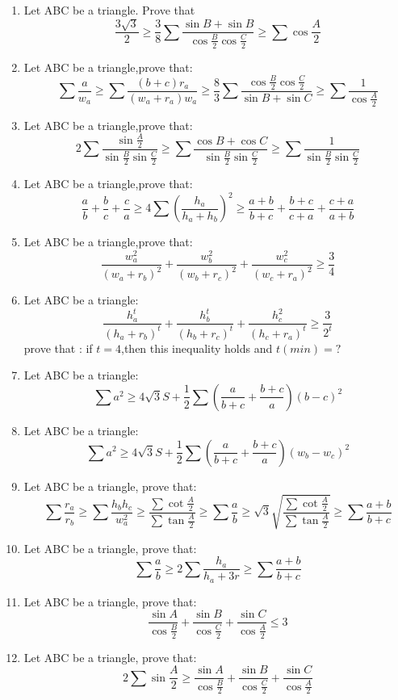 \documentclass{report}
\begin{document}
\begin{enumerate}
	\item Let ABC be a triangle. Prove that$$ \frac{3\sqrt{3}}{2} \geq \frac{3}{8}\sum\frac{\sin{B}+\sin{B}}{\cos\frac{B}{2}\cos\frac{C}{2}} \geq \sum\cos\frac{A}{2}$$
	\item Let ABC be a triangle,prove that:$$ \sum\frac {a}{w_a} \geq \sum\frac {(b + c)r_a}{(w_a + r_a)w_a} \geq \frac {8}{3}\sum\frac {\cos\frac {B}{2}\cos\frac {C}{2}}{\sin{B} + \sin{C}} \geq \sum\frac {1}{\cos\frac {A}{2}}$$
	\item Let ABC be a triangle,prove that:$$ 2\sum\frac{\sin\frac{A}{2}}{\sin\frac{B}{2}\sin\frac{C}{2}} \geq \sum\frac{\cos{B}+\cos{C}}{\sin\frac{B}{2}\sin\frac{C}{2}} \geq \sum\frac{1}{\sin\frac{B}{2}\sin\frac{C}{2}}$$
	\item Let ABC be a triangle,prove that:$$ \frac{a}{b}+\frac{b}{c}+\frac{c}{a} \geq 4\sum(\frac{h_a}{h_a+h_b})^2 \geq \frac{a+b}{b+c}+\frac{b+c}{c+a}+\frac{c+a}{a+b}$$
	\item Let ABC be a triangle,prove that:$$ \frac {w_a^2}{(w_a + r_b)^2} + \frac {w_b^2}{(w_b + r_c)^2} + \frac {w_c^2}{(w_c + r_a)^2} \geq \frac {3}{4}$$
	\item Let ABC be a triangle:$$ \frac {h_a^t}{(h_a + r_b)^t} + \frac {h_b^t}{(h_b + r_c)^t} + \frac {h_c^2}{(h_c + r_a)^t} \geq \frac {3}{2^t}$$prove that : if $t=4$,then this inequality holds and $ t(min) = ?$
	\item Let ABC be a triangle:$$ \sum{a^2} \geq 4\sqrt {3}S +\frac {1}{2}\sum{(\frac {a}{b + c} + \frac {b + c}{a})(b - c)^2}$$
	\item Let ABC be a triangle:$$\sum{a^2} \geq 4\sqrt {3}S + \frac {1}{2}\sum{(\frac {a}{b + c} + \frac {b + c}{a})(w_b - w_c)^2}$$
	\item Let ABC be a triangle, prove that:$$ \sum\frac{r_a}{r_b} \geq \sum\frac{h_bh_c}{w_a^2} \geq \frac {\sum\cot\frac {A}{2}}{\sum\tan\frac {A}{2}} \geq \sum\frac {a}{b} \geq \sqrt {3}\sqrt {\frac {\sum\cot\frac {A}{2}}{\sum\tan\frac {A}{2}}} \geq \sum\frac {a + b}{b + c}$$
	\item Let ABC be a triangle, prove that:$$\sum\frac {a}{b} \geq 2\sum\frac {h_a}{h_a + 3r} \geq \sum\frac {a + b}{b + c}$$
	\item Let ABC be a triangle, prove that:$$ \frac{\sin{A}}{\cos\frac{B}{2}}+\frac{\sin{B}}{\cos\frac{C}{2}}+\frac{\sin{C}}{\cos\frac{A}{2}} \le 3$$
	\item Let ABC be a triangle, prove that:$$2\sum\sin\frac{A}{2} \geq \frac {\sin{A}}{\cos\frac {B}{2}} + \frac {\sin{B}}{\cos\frac {C}{2}} + \frac {\sin{C}}{\cos\frac {A}{2}}$$

\end{enumerate}
\end{document}
